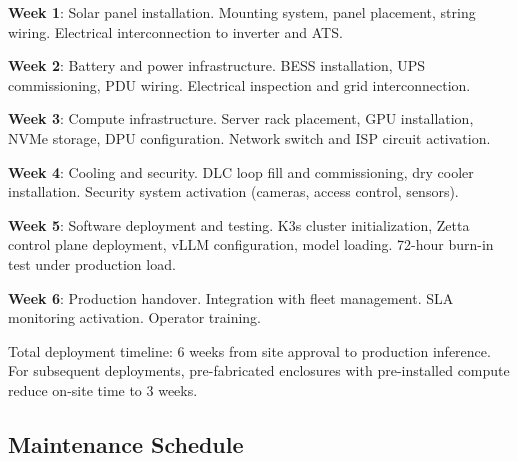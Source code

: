 \documentclass[conference,10pt,letterpaper]{IEEEtran}
\begin{document}
\textbf{Week 1}: Solar panel installation. Mounting system, panel placement, string wiring. Electrical interconnection to inverter and ATS.

\textbf{Week 2}: Battery and power infrastructure. BESS installation, UPS commissioning, PDU wiring. Electrical inspection and grid interconnection.

\textbf{Week 3}: Compute infrastructure. Server rack placement, GPU installation, NVMe storage, DPU configuration. Network switch and ISP circuit activation.

\textbf{Week 4}: Cooling and security. DLC loop fill and commissioning, dry cooler installation. Security system activation (cameras, access control, sensors).

\textbf{Week 5}: Software deployment and testing. K3s cluster initialization, Zetta control plane deployment, vLLM configuration, model loading. 72-hour burn-in test under production load.

\textbf{Week 6}: Production handover. Integration with fleet management. SLA monitoring activation. Operator training.

Total deployment timeline: 6 weeks from site approval to production inference. For subsequent deployments, pre-fabricated enclosures with pre-installed compute reduce on-site time to 3 weeks.

\subsection{Maintenance Schedule}

\begin{table}[!t]
\caption{Preventive Maintenance Schedule}
\label{tab:maintenance}
\centering\scriptsize
{}
\end{table}
\end{document}
